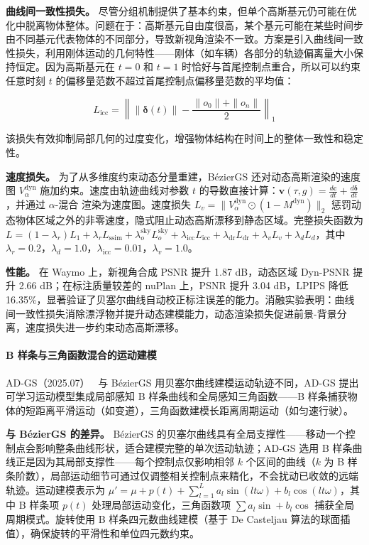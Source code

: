 \textbf{曲线间一致性损失。} 尽管分组机制提供了基本约束，但单个高斯基元仍可能在优化中脱离物体整体。问题在于：高斯基元自由度很高，某个基元可能在某些时间步由不同基元代表物体的不同部分，导致新视角渲染不一致。方案是引入曲线间一致性损失，利用刚体运动的几何特性——刚体（如车辆）各部分的轨迹偏离量大小保持恒定。因为高斯基元在 $t=0$ 和 $t=1$ 时恰好与首尾控制点重合，所以可以约束任意时刻 $t$ 的偏移量范数不超过首尾控制点偏移量范数的平均值：

\begin{equation}
L_{\text{icc}} = \left\| \|\boldsymbol{\delta}(t)\| - \frac{\|o_0\| + \|o_n\|}{2} \right\|_1
\end{equation}

该损失有效抑制局部几何的过度变化，增强物体结构在时间上的整体一致性和稳定性。

\textbf{速度损失。} 为了从多维度约束动态分量重建，B\'ezierGS 还对动态高斯渲染的速度图 $V_{\alpha}^{\text{dyn}}$ 施加约束。速度由轨迹曲线对参数 $t$ 的导数直接计算：$\mathbf{v}(\tau,g) = \frac{d\mathbf{c}}{dt} + \frac{d\boldsymbol{\delta}}{dt}$，并通过 $\alpha$-混合 渲染为速度图。速度损失 $L_v = \|V_{\alpha}^{\text{dyn}} \odot (1 - M^{\text{dyn}})\|_2$ 惩罚动态物体区域之外的非零速度，隐式阻止动态高斯漂移到静态区域。完整损失函数为 $L = (1-\lambda_r)L_1 + \lambda_r L_{\text{ssim}} + \lambda_o^{\text{sky}} L_o^{\text{sky}} + \lambda_{\text{icc}} L_{\text{icc}} + \lambda_{\text{dr}} L_{\text{dr}} + \lambda_v L_v + \lambda_d L_d$，其中 $\lambda_r=0.2$，$\lambda_d=1.0$，$\lambda_{\text{icc}}=0.01$，$\lambda_v=1.0$。

\textbf{性能。} 在 Waymo 上，新视角合成 PSNR 提升 1.87 dB，动态区域 Dyn-PSNR 提升 2.66 dB；在标注质量较差的 nuPlan 上，PSNR 提升 3.04 dB，LPIPS 降低 16.35\%，显著验证了贝塞尔曲线自动校正标注误差的能力。消融实验表明：曲线间一致性损失消除漂浮物并提升动态建模能力，动态渲染损失促进前景-背景分离，速度损失进一步约束动态高斯漂移。

\paragraph{B 样条与三角函数混合的运动建模}

AD-GS（2025.07）~\cite{2507_12137} 与 B\'ezierGS 用贝塞尔曲线建模运动轨迹不同，AD-GS 提出可学习运动模型集成局部感知 B 样条曲线和全局感知三角函数——B 样条捕获物体的短距离平滑运动（如变道），三角函数建模长距离周期运动（如匀速行驶）。

\textbf{与 B\'ezierGS 的差异。} B\'ezierGS 的贝塞尔曲线具有全局支撑性——移动一个控制点会影响整条曲线形状，适合建模完整的单次运动轨迹；AD-GS 选用 B 样条曲线正是因为其局部支撑性——每个控制点仅影响相邻 $k$ 个区间的曲线（$k$ 为 B 样条阶数），局部运动细节可通过仅调整相关控制点来精化，不会扰动已收敛的远端轨迹。运动建模表示为 $\mu' = \mu + p(t) + \sum_{l=1}^{L} a_l \sin(lt\omega) + b_l \cos(lt\omega)$，其中 B 样条项 $p(t)$ 处理局部运动变化，三角函数项 $\sum a_l \sin + b_l \cos$ 捕获全局周期模式。旋转使用 B 样条四元数曲线建模（基于 De Casteljau 算法的球面插值），确保旋转的平滑性和单位四元数约束。

